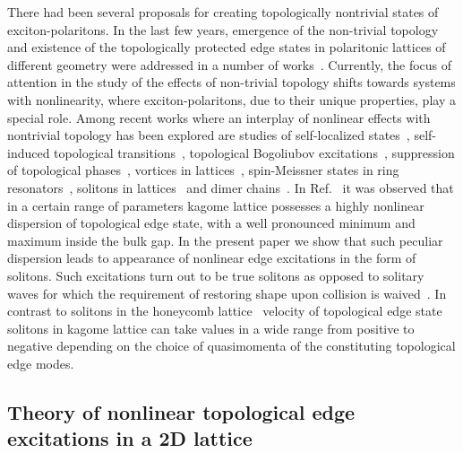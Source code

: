 \documentclass[
aps,
prl,
groupedaddress,
superscriptaddress,
floatfix,
notitlepage
]{revtex4-1}
\begin{document}
There had been several proposals for creating topologically nontrivial states of exciton-polaritons. In the last few years, emergence of the non-trivial topology and existence of the topologically protected edge states in polaritonic lattices of different geometry were addressed in a number of works~\cite{Karzig-PRX-2015, Bardyn-PRB-2015, Nalitov-Z, Yi-PRB-2016, Bardyn-PRB-2016, Janot-PRB-2016, Gulevich-kagome}.
Currently, the focus of attention in the study of the effects of non-trivial topology shifts towards systems with nonlinearity, where exciton-polaritons, due to their unique properties, play a special role. Among recent works where an interplay of nonlinear effects with nontrivial topology has been explored are studies of self-localized states~\cite{Lumer-PRL-2013, Ostrovskaya2013}, self-induced topological transitions~\cite{Hadad-PRB-2016}, topological Bogoliubov excitations~\cite{Bardyn-PRB-2016}, 
suppression of topological phases~\cite{Bleu-PRB-2016}, vortices in lattices~\cite{Kartashov-OL-2016}, spin-Meissner states in ring resonators~\cite{DGulevich-Meissner}, solitons in lattices~\cite{Ablowitz-PRA-2014, Leykam-PRL-2016, Kartashov-Optica-2016, CedraMendez2016} and dimer 
chains~\cite{Soln-PRL-2017}. 
In Ref.~\cite{Gulevich-kagome} it was observed that in a certain range of parameters kagome lattice possesses a highly nonlinear dispersion of topological edge state, with a well pronounced minimum and maximum inside the bulk gap. In the present paper we show that such peculiar dispersion leads to appearance of nonlinear edge excitations in the form of solitons. Such excitations turn out to be true solitons as opposed to solitary waves for which the requirement of restoring shape upon collision is waived~\cite{Rajaraman}. In contrast to solitons in the honeycomb lattice~\cite{Kartashov-Optica-2016} 
velocity of topological edge state solitons in kagome lattice can take values in a wide range from positive to negative 
depending on the choice of quasimomenta of the constituting topological edge modes.

\subsection{Theory of nonlinear topological edge excitations in a 2D lattice}
\end{document}
